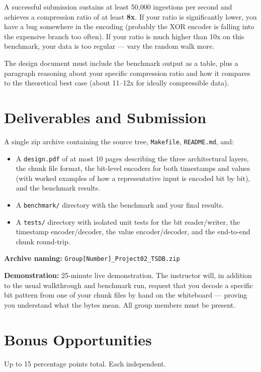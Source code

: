 \documentclass[11pt,a4paper]{article}
\begin{document}
A successful submission sustains at least 50{,}000 ingestions per second and achieves a compression ratio of at least \textbf{8x}. If your ratio is significantly lower, you have a bug somewhere in the encoding (probably the XOR encoder is falling into the expensive branch too often). If your ratio is much higher than 10x on this benchmark, your data is too regular --- vary the random walk more.

The design document must include the benchmark output as a table, plus a paragraph reasoning about your specific compression ratio and how it compares to the theoretical best case (about 11--12x for ideally compressible data).

\section{Deliverables and Submission}

A single zip archive containing the source tree, \texttt{Makefile}, \texttt{README.md}, and:
\begin{itemize}
\item A \texttt{design.pdf} of at most 10 pages describing the three architectural layers, the chunk file format, the bit-level encoders for both timestamps and values (with worked examples of how a representative input is encoded bit by bit), and the benchmark results.
\item A \texttt{benchmark/} directory with the benchmark and your final results.
\item A \texttt{tests/} directory with isolated unit tests for the bit reader/writer, the timestamp encoder/decoder, the value encoder/decoder, and the end-to-end chunk round-trip.
\end{itemize}

\textbf{Archive naming:} \texttt{Group[Number]\_Project02\_TSDB.zip}

\textbf{Demonstration:} 25-minute live demonstration. The instructor will, in addition to the usual walkthrough and benchmark run, request that you decode a specific bit pattern from one of your chunk files by hand on the whiteboard --- proving you understand what the bytes mean. All group members must be present.

\section{Bonus Opportunities}

Up to 15 percentage points total. Each independent.
\end{document}
